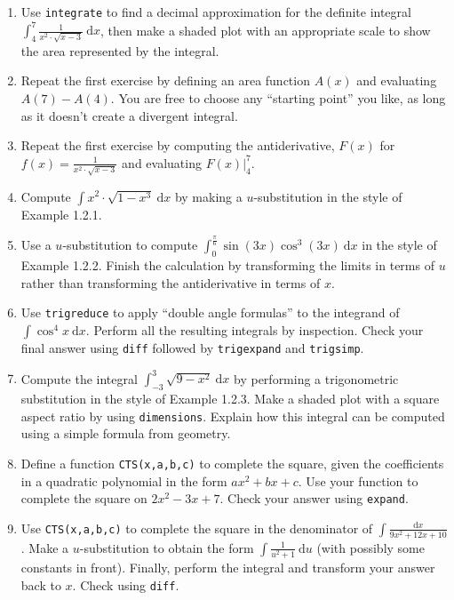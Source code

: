 \documentclass[10.5pt,twoside]{report}
\theoremstyle{definition}
\begin{document}
\begin{enumerate}

\item  Use \verb|integrate| to find a decimal approximation for the definite integral $\displaystyle \int _4^7 \frac{1}{x^2\cdot \sqrt{x-3}}\ \mathrm{d}x$, then make a shaded plot with an appropriate scale to show the area represented by the integral.

\item  Repeat the first exercise by defining an area function $A(x)$ and evaluating $A(7)-A(4)$.  You are free to choose any ``starting point'' you like, as long as it doesn't create a divergent integral.

\item  Repeat the first exercise by computing the antiderivative, $F(x)$ for $f(x)=\displaystyle \frac{1}{x^2\cdot \sqrt{x-3}}$ and evaluating $F(x)|_4^7$.

\item Compute $\displaystyle \int x^2\cdot \sqrt{1-x^3}\ \mathrm{d} x$ by making a $u$-substitution in the style of Example 1.2.1.


\item Use a $u$-substitution to compute $\displaystyle \int_0^{\frac{\pi}{6}} \sin{(3x)} \cos^3{(3x)}\ \mathrm{d}x$ in the style of Example 1.2.2.  Finish the calculation by transforming the limits in terms of $u$ rather than transforming the antiderivative in terms of $x$.


\item Use \verb|trigreduce| to apply ``double angle formulas'' to the integrand of $\displaystyle \int \cos^4{x}\ \mathrm{d} x$.  Perform all the resulting integrals by inspection.  Check your final answer using \verb|diff| followed by \verb|trigexpand| and \verb|trigsimp|.

\item Compute the integral $\displaystyle \int_{-3}^{3} \sqrt{9-x^2}\ \mathrm{d}x$ by performing a trigonometric substitution in the style of Example 1.2.3.  Make a shaded plot with a square aspect ratio by using \verb|dimensions|.  Explain how this integral can be computed using a simple formula from geometry.

\item Define a function \verb|CTS(x,a,b,c)| to complete the square, given the coefficients in a quadratic polynomial in the form $ax^2+bx+c$.  Use your function to complete the square on $2x^2-3x+7$.  Check your answer using \verb|expand|.


\item Use \verb|CTS(x,a,b,c)| to complete the square in the denominator of $\displaystyle \int \frac{\mathrm{d}x}{9x^2+12x+10}$.  Make a $u$-substitution to obtain the form $\displaystyle \int \frac{1}{u^2+1}\ \mathrm{d}u$ (with possibly some constants in front).  Finally, perform the integral and transform your answer back to $x$.  Check using \verb|diff|.


\end{enumerate}
\end{document}
